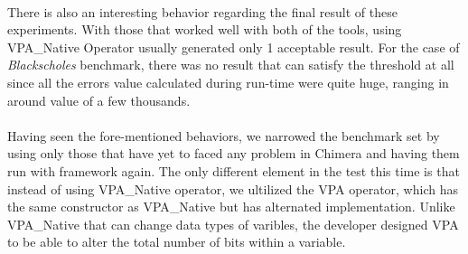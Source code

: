 ~\\
There is also an interesting behavior regarding the final result of these experiments. With those that worked well with both of the tools, using VPA\_Native Operator usually generated only 1 acceptable result. For the case of \textit{Blackscholes} benchmark, there was no result that can satisfy the threshold at all since all the errors value calculated during run-time were quite huge, ranging in around value of a  few thousands.\\
~\\
Having seen the fore-mentioned behaviors, we narrowed the benchmark set by using only those that have yet to faced any problem in Chimera and having them run with framework again. The only different element in the test this time is that instead of using VPA\_Native operator, we ultilized the VPA operator, which has the same constructor as VPA\_Native but has alternated implementation. Unlike VPA\_Native that can change data types of varibles, the developer designed VPA to be able to alter the total number of bits within a variable. \\


